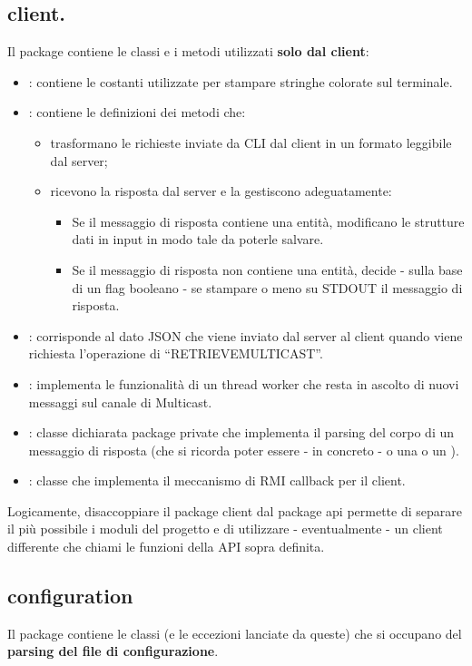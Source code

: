 \documentclass[11pt, italian, openany]{book}
\begin{document}
\begin{sloppypar}
\subsection*{client.}
Il package contiene le classi e i metodi utilizzati \textbf{solo dal client}:
\begin{itemize}[itemsep=0pt, parsep=0pt, topsep=0pt]
	\item {}: contiene le costanti utilizzate per stampare stringhe colorate sul terminale.
	\item {}: contiene le definizioni dei metodi che:
	\begin{itemize}
		\item trasformano le richieste inviate da CLI dal client in un formato leggibile dal server;
		\item ricevono la risposta dal server e la gestiscono adeguatamente:
		\begin{itemize}
			\item Se il messaggio di risposta contiene una entit\`a, modificano le strutture dati in input in modo tale da poterle
			salvare.
			\item Se il messaggio di risposta non contiene una entit\`a, decide - sulla base di un flag booleano - se stampare o meno
			su STDOUT il messaggio di risposta.
		\end{itemize}
	\end{itemize}
	\item {}: corrisponde al dato JSON che viene inviato dal server al client quando viene richiesta l'operazione di
	``RETRIEVEMULTICAST''.
	\item {}: implementa le funzionalit\`a di un thread worker che resta in ascolto di nuovi messaggi sul canale di
	Multicast.
	\item {}: classe dichiarata package private che implementa il parsing del corpo di un messaggio di risposta
	(che si ricorda poter essere - in concreto - o una  o un ).
	\item {}: classe che implementa il meccanismo di RMI callback per il client.
\end{itemize}
Logicamente, disaccoppiare il package client dal package api permette di separare il pi\`u possibile i moduli del progetto e di
utilizzare - eventualmente - un client differente che chiami le funzioni della API sopra definita.

\subsection*{configuration}
Il package contiene le classi (e le eccezioni lanciate da queste) che si occupano del \textbf{parsing del file di configurazione}.


\end{sloppypar}
\end{document}
